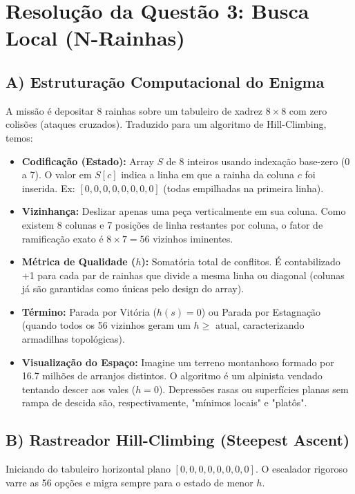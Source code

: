 \section*{Resolução da Questão 3: Busca Local (N-Rainhas)}

\subsection*{A) Estruturação Computacional do Enigma}

A missão é depositar 8 rainhas sobre um tabuleiro de xadrez $8 \times 8$ com zero colisões (ataques cruzados). Traduzido para um algoritmo de Hill-Climbing, temos:

\begin{itemize}
    \item \textbf{Codificação (Estado):} Array $S$ de 8 inteiros usando indexação base-zero (0 a 7). O valor em $S[c]$ indica a linha em que a rainha da coluna $c$ foi inserida. Ex: $[0, 0, 0, 0, 0, 0, 0, 0]$ (todas empilhadas na primeira linha).
    \item \textbf{Vizinhança:} Deslizar apenas uma peça verticalmente em sua coluna. Como existem 8 colunas e 7 posições de linha restantes por coluna, o fator de ramificação exato é $8 \times 7 = 56$ vizinhos iminentes.
    \item \textbf{Métrica de Qualidade ($h$):} Somatória total de conflitos. É contabilizado +1 para cada par de rainhas que divide a mesma linha ou diagonal (colunas já são garantidas como únicas pelo design do array).
    \item \textbf{Término:} Parada por Vitória ($h(s)=0$) ou Parada por Estagnação (quando todos os 56 vizinhos geram um $h \ge$ atual, caracterizando armadilhas topológicas).
    \item \textbf{Visualização do Espaço:} Imagine um terreno montanhoso formado por 16.7 milhões de arranjos distintos. O algoritmo é um alpinista vendado tentando descer aos vales ($h=0$). Depressões rasas ou superfícies planas sem rampa de descida são, respectivamente, "mínimos locais" e "platôs".
\end{itemize}

\subsection*{B) Rastreador Hill-Climbing (Steepest Ascent)}

Iniciando do tabuleiro horizontal plano $[0, 0, 0, 0, 0, 0, 0, 0]$. O escalador rigoroso varre as 56 opções e migra sempre para o estado de menor $h$.

